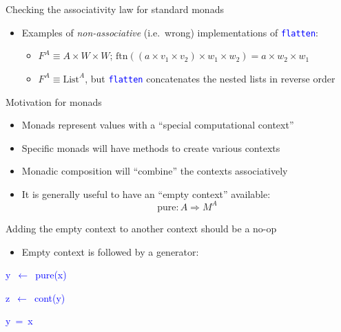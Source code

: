 \documentclass[english]{beamer}
\newenvironment{lyxcode}
  {\par\begin{list}{}{
    \setlength{\rightmargin}{\leftmargin}
    \setlength{\listparindent}{0pt}%
    \raggedright
    \setlength{\itemsep}{0pt}
    \setlength{\parsep}{0pt}
    \normalfont\ttfamily}%
   \def\{{\char`\{}
   \def\}{\char`\}}
   \def\textasciitilde{\char`\~}
   \item[]}
  {\end{list}}
\begin{document}
\begin{frame}{Checking the associativity law for standard monads}
\begin{itemize}
\begin{itemize}
\end{itemize}
\item Examples of \emph{non-associative} (i.e.\ wrong) implementations
of \texttt{\textcolor{blue}{\footnotesize{}flatten}}:
\begin{itemize}
\item $F^{A}\equiv A\times W\times W$; $\text{ftn}\left(\left(a\times v_{1}\times v_{2}\right)\times w_{1}\times w_{2}\right)=a\times w_{2}\times w_{1}$
\item $F^{A}\equiv\text{List}^{A}$, but \texttt{\textcolor{blue}{\footnotesize{}flatten}}
concatenates the nested lists in reverse order
\end{itemize}
\end{itemize}
\end{frame}

\begin{frame}{Motivation for monads}

\begin{itemize}
\item Monads represent values with a ``special computational context''
\item Specific monads will have methods to create various contexts
\item Monadic composition will ``combine'' the contexts associatively
\item It is generally useful to have an ``empty context'' available:
\[
\text{pure}:A\Rightarrow M^{A}
\]
\end{itemize}
Adding the empty context to another context should be a no-op
\begin{itemize}
\item Empty context is followed by a generator:
\end{itemize}
\texttt{\textcolor{blue}{\footnotesize{}}}%
\begin{minipage}[c][1\totalheight][t]{0.49\columnwidth}%
\begin{lyxcode}
\textcolor{blue}{\footnotesize{}y~$\leftarrow$~pure(x)}{\footnotesize\par}

\textcolor{blue}{\footnotesize{}z~$\leftarrow$~cont(y)}{\footnotesize\par}
\end{lyxcode}
%
\end{minipage}\texttt{\textcolor{blue}{\footnotesize{}\hfill{}}}%
\begin{minipage}[c][1\totalheight][t]{0.4\columnwidth}%
\begin{lyxcode}
\textcolor{blue}{\footnotesize{}y~=~x}{\footnotesize\par}


\end{lyxcode}
\end{minipage}
\end{frame}
\end{document}
